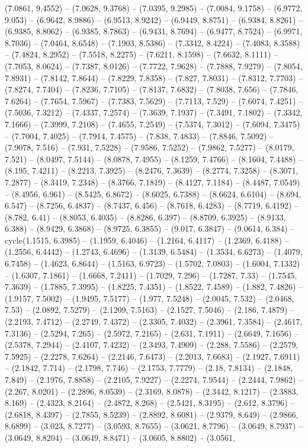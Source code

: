 (7.0861, 9.4552) -- (7.0628, 9.3768) -- (7.0395, 9.2985) -- (7.0084, 9.1758) -- (6.9772, 9.053) -- (6.9642, 8.9886) -- (6.9513, 8.9242) -- (6.9449, 8.8751) -- (6.9384, 8.8261) -- (6.9385, 8.8062) -- (6.9385, 8.7863) -- (6.9431, 8.7694) -- (6.9477, 8.7524) -- (6.9971, 8.7036) -- (7.0464, 8.6548) -- (7.1903, 8.5386) -- (7.3342, 8.4224) -- (7.4083, 8.3588) -- (7.4824, 8.2952) -- (7.5518, 8.2275) -- (7.6211, 8.1598) -- (7.6632, 8.1111) -- (7.7053, 8.0624) -- (7.7387, 8.0126) -- (7.7722, 7.9628) -- (7.7888, 7.9279) -- (7.8054, 7.8931) -- (7.8142, 7.8644) -- (7.8229, 7.8358) -- (7.827, 7.8031) -- (7.8312, 7.7703) -- (7.8274, 7.7404) -- (7.8236, 7.7105) -- (7.8137, 7.6832) -- (7.8038, 7.656) -- (7.7846, 7.6264) -- (7.7654, 7.5967) -- (7.7383, 7.5629) -- (7.7113, 7.529) -- (7.6074, 7.4251) -- (7.5036, 7.3212) -- (7.4337, 7.2574) -- (7.3639, 7.1937) -- (7.3491, 7.1802) -- (7.3342, 7.1666) -- (7.3999, 7.2108) -- (7.4655, 7.2549) -- (7.5374, 7.3012) -- (7.6094, 7.3475) -- (7.7004, 7.4025) -- (7.7914, 7.4575) -- (7.838, 7.4833) -- (7.8846, 7.5092) -- (7.9078, 7.516) -- (7.931, 7.5228) -- (7.9586, 7.5252) -- (7.9862, 7.5277) -- (8.0179, 7.521) -- (8.0497, 7.5144) -- (8.0878, 7.4955) -- (8.1259, 7.4766) -- (8.1604, 7.4488) -- (8.195, 7.4211) -- (8.2213, 7.3925) -- (8.2476, 7.3639) -- (8.2774, 7.3258) -- (8.3071, 7.2877) -- (8.3419, 7.2348) -- (8.3766, 7.1819) -- (8.4127, 7.1184) -- (8.4487, 7.0549) -- (8.4956, 6.961) -- (8.5425, 6.8672) -- (8.6025, 6.7388) -- (8.6624, 6.6104) -- (8.694, 6.547) -- (8.7256, 6.4837) -- (8.7437, 6.456) -- (8.7618, 6.4283) -- (8.7719, 6.4192) -- (8.782, 6.41) -- (8.8053, 6.4035) -- (8.8286, 6.397) -- (8.8709, 6.3925) -- (8.9133, 6.388) -- (8.9429, 6.3868) -- (8.9725, 6.3855) -- (9.017, 6.3847) -- (9.0614, 6.384) -- cycle(1.1515, 6.3985) -- (1.1959, 6.4046) -- (1.2164, 6.4117) -- (1.2369, 6.4188) -- (1.2556, 6.4442) -- (1.2743, 6.4696) -- (1.3139, 6.5484) -- (1.3534, 6.6273) -- (1.4079, 6.7458) -- (1.4623, 6.8644) -- (1.5163, 6.9723) -- (1.5702, 7.0803) -- (1.6004, 7.1332) -- (1.6307, 7.1861) -- (1.6668, 7.2411) -- (1.7029, 7.296) -- (1.7287, 7.33) -- (1.7545, 7.3639) -- (1.7885, 7.3995) -- (1.8225, 7.4351) -- (1.8522, 7.4589) -- (1.882, 7.4826) -- (1.9157, 7.5002) -- (1.9495, 7.5177) -- (1.977, 7.5248) -- (2.0045, 7.532) -- (2.0468, 7.53) -- (2.0892, 7.5279) -- (2.1209, 7.5163) -- (2.1527, 7.5046) -- (2.186, 7.4879) -- (2.2193, 7.4712) -- (2.2749, 7.4372) -- (2.3305, 7.4032) -- (2.3961, 7.3584) -- (2.4617, 7.3136) -- (2.5294, 7.265) -- (2.5972, 7.2165) -- (2.631, 7.1911) -- (2.6649, 7.1656) -- (2.5378, 7.2944) -- (2.4107, 7.4232) -- (2.3493, 7.4909) -- (2.288, 7.5586) -- (2.2579, 7.5925) -- (2.2278, 7.6264) -- (2.2146, 7.6473) -- (2.2013, 7.6683) -- (2.1927, 7.6911) -- (2.1842, 7.714) -- (2.1798, 7.746) -- (2.1753, 7.7779) -- (2.18, 7.8134) -- (2.1848, 7.849) -- (2.1976, 7.8858) -- (2.2105, 7.9227) -- (2.2274, 7.9544) -- (2.2444, 7.9862) -- (2.267, 8.0201) -- (2.2896, 8.0539) -- (2.3169, 8.0878) -- (2.3442, 8.1217) -- (2.3883, 8.169) -- (2.4323, 8.2164) -- (2.4872, 8.268) -- (2.5421, 8.3195) -- (2.612, 8.3796) -- (2.6818, 8.4397) -- (2.7855, 8.5239) -- (2.8892, 8.6081) -- (2.9379, 8.649) -- (2.9866, 8.6899) -- (3.023, 8.7277) -- (3.0593, 8.7655) -- (3.0621, 8.7796) -- (3.0649, 8.7937) -- (3.0649, 8.8204) -- (3.0649, 8.8471) -- (3.0605, 8.8802) -- (3.0561, 